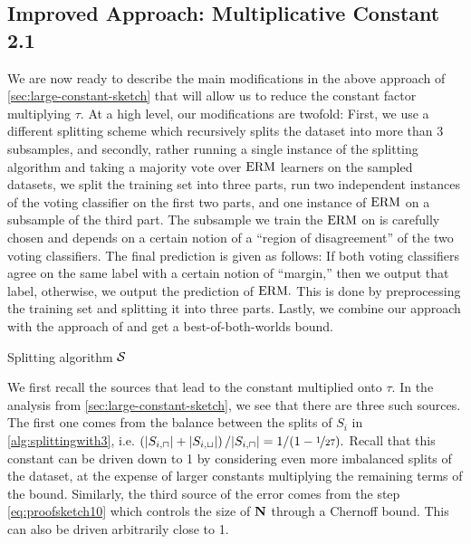 \subsection{Improved Approach: Multiplicative Constant 2.1}
We are now ready to describe the main modifications in the above approach of \cref{sec:large-constant-sketch}
that will allow us to reduce the constant factor multiplying $\tau.$
At a high level, our modifications are twofold: First, we use a different
splitting scheme which recursively splits the dataset into more than 3 subsamples, and secondly,
rather running a single instance of the splitting algorithm and taking 
a majority vote over $\mathrm{ERM}$ learners on the sampled datasets, we split the training set into three parts, run two independent instances
of the voting classifier on the first two parts, and one instance of $\mathrm{ERM}$
on a subsample of the third part. The subsample we train the $\mathrm{ERM}$ on
is carefully chosen and depends on a certain notion of a ``region of disagreement''
of the two voting classifiers.
The final prediction is given as follows: If both voting classifiers
agree on the same label with a certain notion of ``margin,'' then we output
that label, otherwise, we output the prediction of $\mathrm{ERM}.$
This is done by preprocessing the training
set and splitting it into three parts. Lastly, we combine our approach
with the approach of \citet{hanneke2024revisiting} and get a best-of-both-worlds bound.

\begin{algorithm}
    \caption{Splitting algorithm $\mathcal{S}$}\label{alg:splittingwith27}
\end{algorithm}

We first recall the sources that lead to the constant multiplied onto $\tau$. In the analysis from \cref{sec:large-constant-sketch}, we see that there are three such sources. The first one comes from the balance between the splits of $ S_{i} $ in \cref{alg:splittingwith3}, i.e. $ \left(|S_{i,\sqcap}|+|S_{i,\sqcup}|\right)/|S_{i,\sqcap}|=1/(1-\nicefrac{1}{27}).$ 
Recall that this constant can be driven down to 1 by considering even more imbalanced splits of the dataset, at the expense
of larger constants multiplying the remaining terms of the bound.
Similarly, the third source of the 
error
comes from the step \cref{eq:proofsketch10} which controls the size of $ \mathbf{N} $ through a Chernoff bound.
This can also be driven arbitrarily close to 1.

